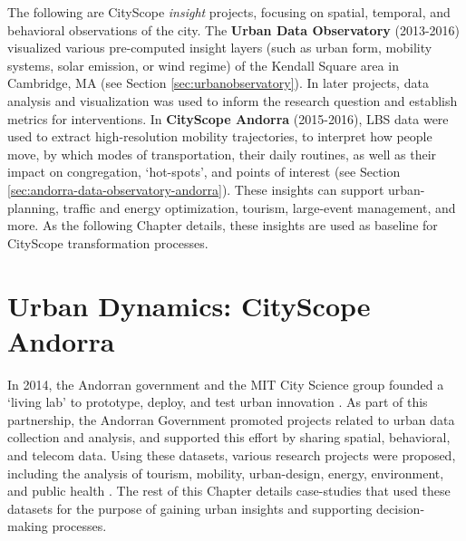  {
  The following are CityScope \textit{insight} projects, focusing on spatial, temporal, and behavioral observations of the city. The \textbf{Urban Data Observatory} \cite{Hadhrawi2016} (2013-2016) visualized various pre-computed insight layers (such as urban form, mobility systems, solar emission, or wind regime) of the Kendall Square area in Cambridge, MA (see Section \eqref{sec:urbanobservatory}). In later projects, data analysis and visualization was used to inform the research question and establish metrics for interventions. In \textbf{CityScope Andorra} (2015-2016), LBS data were used to extract high-resolution mobility trajectories, to interpret how people move, by which modes of transportation, their daily routines, as well as their impact on congregation, `hot-spots', and points of interest (see Section \eqref{sec:andorra-data-observatory-andorra}). These insights can support urban-planning, traffic and energy optimization, tourism, large-event management, and more. As the following Chapter details, these insights are used as baseline for CityScope transformation processes.
 }

\label{sec:urbanobservatory}

\section{Urban Dynamics: CityScope Andorra}\label{sec:andorra-data-observatory-andorra}

{
    In 2014, the Andorran government and the MIT City Science group founded a `living lab' to prototype, deploy, and test urban innovation \cite{SmallEur15:online}. As part of this partnership, the Andorran Government promoted projects related to urban data collection and analysis, and supported this effort by sharing spatial, behavioral, and telecom data. Using these datasets, various research projects were proposed, including the analysis of tourism, mobility, urban-design, energy, environment, and public health \cite{9580719, Grignard:2018:CAM:3237383.3238030, leng2016analysis, noyman_inpress, doorley2020mpec}. The rest of this Chapter details case-studies that used these datasets for the purpose of gaining urban insights and supporting decision-making processes.
}
\label{sec:and_abm}
\label{sec:revurb}


